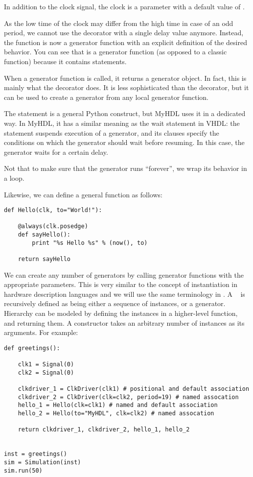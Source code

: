 In addition to the clock signal, the clock
 is a parameter with a default value of .

As the low time of the clock may differ from the high time in case of
an odd period, we cannot use the  decorator with a
single delay value anymore. Instead, the  function
is now a generator function with an explicit definition of the desired
behavior. You can see that  is a generator function (as
opposed to a classic function) because it contains 
statements.

When a generator function is called, it returns a generator object. In
fact, this is mainly what the  decorator does. It
is less sophisticated than the  decorator,
but it can be used to create a generator from any local generator
function.

The  statement is a general Python construct, but MyHDL
uses it in a dedicated way.  In MyHDL, it has a similar meaning as the
wait statement in VHDL: the statement suspends execution of a
generator, and its clauses specify the conditions on which the
generator should wait before resuming. In this case, the generator
waits for a certain delay.

Not that to make sure that the generator runs ``forever'', we wrap its
behavior in a  loop.

Likewise, we can define a general  function as follows:

\begin{verbatim}
def Hello(clk, to="World!"):

    @always(clk.posedge)
    def sayHello():
        print "%s Hello %s" % (now(), to)

    return sayHello
\end{verbatim}

We can create any number of generators by calling generator functions
with the appropriate parameters. This is very similar to the concept
of instantiation in hardware description languages and we will use
the same terminology in \myhdl{}. A \myhdl\  is
recursively defined as being either a sequence of instances, or a
generator.  Hierarchy can be modeled by defining the instances in a
higher-level function, and returning them. 
A  constructor takes an arbitrary number of
instances as its arguments.
For example:

\begin{verbatim}
def greetings():

    clk1 = Signal(0)
    clk2 = Signal(0)
    
    clkdriver_1 = ClkDriver(clk1) # positional and default association
    clkdriver_2 = ClkDriver(clk=clk2, period=19) # named assocation 
    hello_1 = Hello(clk=clk1) # named and default association
    hello_2 = Hello(to="MyHDL", clk=clk2) # named assocation

    return clkdriver_1, clkdriver_2, hello_1, hello_2


inst = greetings()
sim = Simulation(inst)
sim.run(50)
\end{verbatim}

